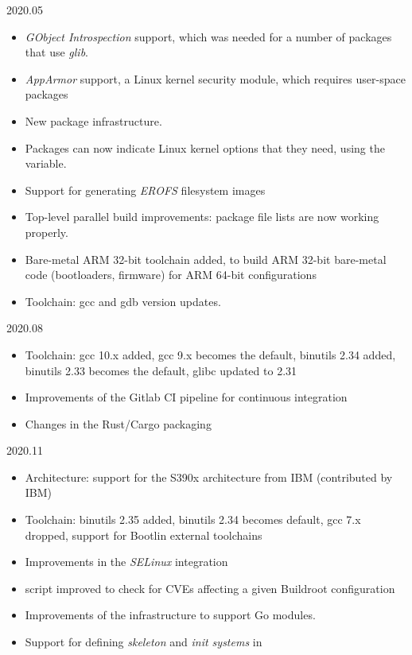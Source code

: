 \begin{frame}{2020.05}
  \begin{itemize}
  \item {\em GObject Introspection} support, which was needed for a
    number of packages that use {\em glib}.
  \item {\em AppArmor} support, a Linux kernel security module, which
    requires user-space packages
  \item New  package infrastructure.
  \item Packages can now indicate Linux kernel options that they need,
    using the  variable.
  \item Support for generating {\em EROFS} filesystem images
  \item Top-level parallel build improvements: package file lists are
    now working properly.
  \item Bare-metal ARM 32-bit toolchain added, to build ARM 32-bit
    bare-metal code (bootloaders, firmware) for ARM 64-bit
    configurations
  \item Toolchain: gcc and gdb version updates.
  \end{itemize}
\end{frame}

\begin{frame}{2020.08}
  \begin{itemize}
  \item Toolchain: gcc 10.x added, gcc 9.x becomes the default,
    binutils 2.34 added, binutils 2.33 becomes the default, glibc
    updated to 2.31
  \item Improvements of the Gitlab CI pipeline for continuous
    integration
  \item Changes in the Rust/Cargo packaging
  \end{itemize}
\end{frame}

\begin{frame}{2020.11}
  \begin{itemize}
  \item Architecture: support for the S390x architecture from IBM
    (contributed by IBM)
  \item Toolchain: binutils 2.35 added, binutils 2.34 becomes default,
    gcc 7.x dropped, support for Bootlin external toolchains
  \item Improvements in the {\em SELinux} integration
  \item {} script improved to check for CVEs affecting a
    given Buildroot configuration
  \item Improvements of the  infrastructure to
    support Go modules.
  \item Support for defining {\em skeleton} and {\em init systems} in
  \end{itemize}
\end{frame}

